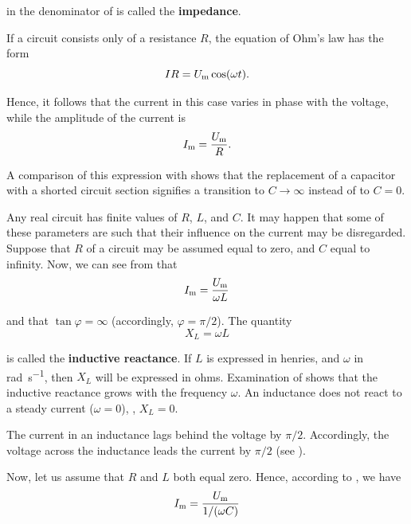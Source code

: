 \noindent
in the denominator of  is called the \textbf{impedance}.

If a circuit consists only of a resistance $R$, the equation of Ohm's law has the form
\begin{equation*}
    IR = U_{\text{m}} \cos(\omega t).
\end{equation*}

\noindent
Hence, it follows that the current in this case varies in phase with the voltage, while the amplitude of the current is
\begin{equation*}
    I_{\text{m}} = \frac{U_{\text{m}}}{R}.
\end{equation*}

\noindent
A comparison of this expression with  shows that the replacement of a capacitor with a shorted circuit section signifies a transition to $C\to\infty$ instead of to $C=0$.

Any real circuit has finite values of $R$, $L$, and $C$.
It may happen that some of these parameters are such that their influence on the current may be disregarded.
Suppose that $R$ of a circuit may be assumed equal to zero, and $C$ equal to infinity.
Now, we can see from  that
\begin{equation}\label{eq:13_50}
    I_{\text{m}} = \frac{U_{\text{m}}}{\omega L}
\end{equation}

\noindent
and that $\tan\varphi=\infty$ (accordingly, $\varphi=\pi/2$).
The quantity
\begin{equation}\label{eq:13_51}
    X_L = \omega L
\end{equation}

\noindent
is called the \textbf{inductive reactance}.
If $L$ is expressed in henries, and $\omega$ in \si{\radian\per\second}, then $X_L$ will be expressed in ohms.
Examination of  shows that the inductive reactance grows with the frequency $\omega$.
An inductance does not react to a steady current ($\omega=0$), \ie, $X_L=0$.

The current in an inductance lags behind the voltage by $\pi/2$.
Accordingly, the voltage across the inductance leads the current by $\pi/2$ (see ).

Now, let us assume that $R$ and $L$ both equal zero.
Hence, according to , we have
\begin{equation}\label{eq:13_52}
    I_{\text{m}} = \frac{U_{\text{m}}}{1/(\omega C)}
\end{equation}

